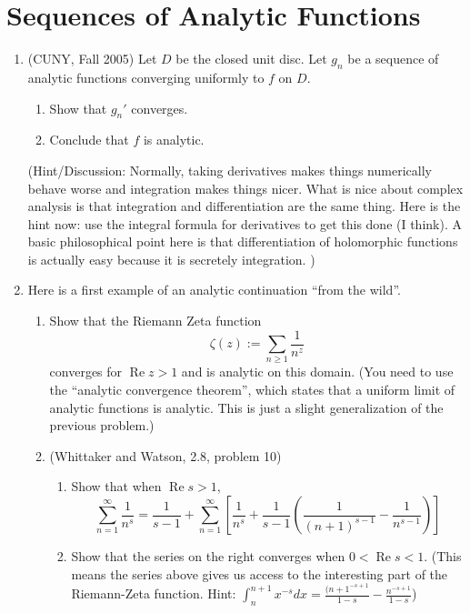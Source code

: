 \documentclass[a4paper,10pt]{article}
\renewcommand{\Re}{\operatorname{Re}}
\begin{document}
\newpage 
\section{Sequences of Analytic Functions}

\begin{enumerate}
	\item (CUNY, Fall 2005)
	Let $D$ be the closed unit disc. 
	Let $g_n$ be a sequence of analytic functions converging uniformly to $f$ on $D$. 
	\begin{enumerate}
		\item Show that $g_n'$ converges.
		\item Conclude that $f$ is analytic.
	\end{enumerate}

(Hint/Discussion: Normally, taking derivatives makes things numerically behave worse and integration makes things nicer. What is nice about complex analysis is that integration and differentiation are the same thing. Here is the hint now: use the integral formula for derivatives to get this done (I think). A basic philosophical point here is that differentiation of holomorphic functions is actually easy because it is secretely integration. )

	\item 
	Here is a first example of an analytic continuation ``from the wild''. 
	\begin{enumerate}
		\item Show that the Riemann Zeta function 
		$$ \zeta(z):=\sum_{n\geq 1} \frac{1}{n^z}$$
		converges for $\Re z > 1$ and is analytic on this domain. (You need to use the ``analytic convergence theorem'', which states that a uniform limit of analytic functions is analytic. This is just a slight generalization of the previous problem.)
		\item (Whittaker and Watson, 2.8, problem 10) 
		\begin{enumerate}
			\item Show that when $\Re s>1$,
			$$ \sum_{n=1}^{\infty} \frac{1}{n^s} = \frac{1}{s-1} + \sum_{n=1}^{\infty} \left[ \frac{1}{n^s} + \frac{1}{s-1} \left( \frac{1}{(n+1)^{s-1}} - \frac{1}{n^{s-1}} \right) \right]$$
			\item Show that the series on the right converges when $0<\Re s<1$. (This means the series above gives us access to the interesting part of the Riemann-Zeta function. Hint: $ \int_n^{n+1} x^{-s}dx = \frac{(n+1^{-s+1}}{1-s} - \frac{n^{-s+1}}{1-s} $)
		\end{enumerate}
	\end{enumerate}

\end{enumerate}
\end{document}

